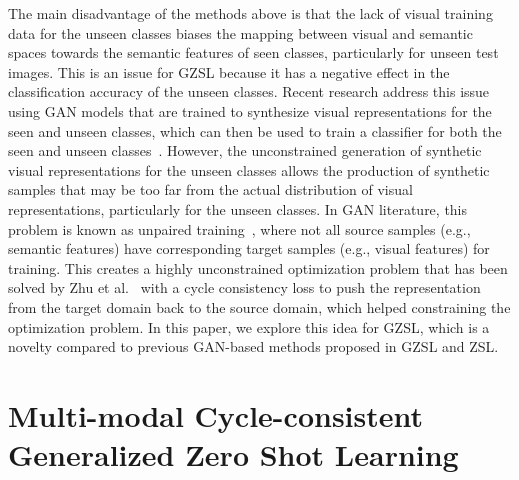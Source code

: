 \documentclass[runningheads]{llncs}
\begin{document}
The main disadvantage of the methods above is that the lack of visual training data for the unseen classes biases the mapping between visual and semantic spaces towards the semantic features of seen classes, particularly for unseen test images.  This is an issue for GZSL because it has a negative effect in the classification accuracy of the unseen classes.  Recent research address this issue using GAN models that are trained to synthesize visual representations for the seen and unseen classes, which can then be used to train a classifier for both the seen and unseen classes~\cite{long2017zero,bucher2017generating}. However, the unconstrained generation of synthetic visual representations for the unseen classes allows the production of synthetic samples that may be too far from the actual distribution of visual representations, particularly for the unseen classes.  
In GAN literature, this problem is known as unpaired training~\cite{CycleGAN2017}, where not all source samples (e.g., semantic features) have corresponding target samples (e.g., visual features) for training.  This creates a highly unconstrained optimization problem that has been solved by Zhu et al.~\cite{CycleGAN2017} with a cycle consistency loss to push the representation from the target domain back to the source domain, which helped constraining the optimization problem.  In this paper, we explore this idea for GZSL, which is a novelty compared to previous GAN-based methods proposed in GZSL and ZSL.  

%
%
%
%
%
%
%

\section{Multi-modal Cycle-consistent Generalized Zero Shot Learning}
\label{sec:method}
\end{document}
